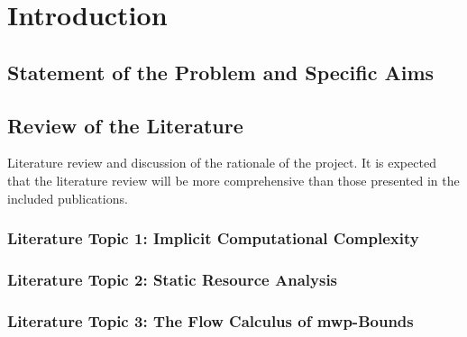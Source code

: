 \dedication{}

\begin{abstract}\end{abstract}

\mainmatter

\chapter{Introduction}\label{introduction}
\clearpage

    \section{Statement of the Problem and Specific Aims}\label{intro}
    
    \clearpage

    \section{Review of the Literature}\label{sec:pre}

    Literature review and discussion of the rationale of the project.
    It is expected that the literature review will be more comprehensive than
    those presented in the included publications.

        \subsection{Literature Topic 1: Implicit Computational Complexity}
        \label{icc}
        

        \subsection{Literature Topic 2: Static Resource Analysis}
        \label{static-analysis}
        

        \subsection{Literature Topic 3: The Flow Calculus of mwp-Bounds}
        \label{flow-calculus}
        

